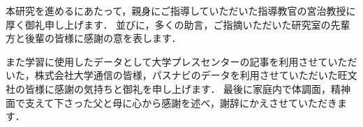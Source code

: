 本研究を進めるにあたって，親身にご指導していただいた指導教官の宮治教授に厚く御礼申し上げます．
並びに，多くの助言，ご指摘いただいた研究室の先輩方と後輩の皆様に感謝の意を表します．

また学習に使用したデータとして大学プレスセンターの記事を利用させていただいた，株式会社大学通信の皆様，パスナビのデータを利用させていただいた旺文社の皆様に感謝の気持ちと御礼を申し上げます．
最後に家庭内で体調面，精神面で支えて下さった父と母に心から感謝を述べ，謝辞にかえさせていただきます．